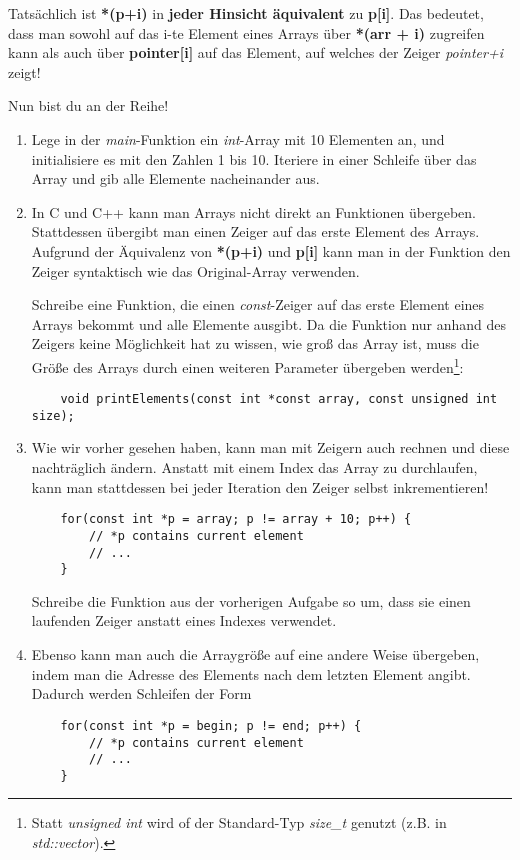 Tatsächlich ist \textbf{*(p+i)} in \textbf{jeder Hinsicht äquivalent} zu \textbf{p[i]}.
Das bedeutet, dass man sowohl auf das i-te Element eines Arrays über \textbf{*(arr + i)} zugreifen kann als auch über \textbf{pointer[i]} auf das Element, auf welches der Zeiger \emph{pointer+i} zeigt!

Nun bist du an der Reihe!

\begin{enumerate}
\item 
Lege in der \emph{main}-Funktion ein \emph{int}-Array mit 10 Elementen an, und initialisiere es mit den Zahlen 1 bis 10.
Iteriere in einer Schleife über das Array und gib alle Elemente nacheinander aus.

\item
In C und C++ kann man Arrays nicht direkt an Funktionen übergeben.
Stattdessen übergibt man einen Zeiger auf das erste Element des Arrays. Aufgrund der Äquivalenz von \textbf{*(p+i) } und \textbf{p[i]} kann man in der Funktion den Zeiger syntaktisch wie das Original-Array verwenden.

Schreibe eine Funktion, die einen \emph{const}-Zeiger auf das erste Element eines Arrays bekommt und alle Elemente ausgibt.
Da die Funktion nur anhand des Zeigers keine Möglichkeit hat zu wissen, wie groß das Array ist, muss die Größe des Arrays durch einen weiteren Parameter übergeben werden\footnote{Statt \emph{unsigned int} wird of der Standard-Typ \emph{size\_t} genutzt (z.B. in \emph{std::vector}).}:
\begin{lstlisting}
	void printElements(const int *const array, const unsigned int size);
\end{lstlisting}

\item
Wie wir vorher gesehen haben, kann man mit Zeigern auch rechnen und diese nachträglich ändern.
Anstatt mit einem Index das Array zu durchlaufen, kann man stattdessen bei jeder Iteration den Zeiger selbst inkrementieren! 

\begin{lstlisting}
	for(const int *p = array; p != array + 10; p++) {
		// *p contains current element
		// ...
	}
\end{lstlisting}

Schreibe die Funktion aus der vorherigen Aufgabe so um, dass sie einen laufenden Zeiger anstatt eines Indexes verwendet.

\item
Ebenso kann man auch die Arraygröße auf eine andere Weise übergeben, indem man  die Adresse des Elements nach dem letzten Element angibt.
Dadurch werden Schleifen der Form
\begin{lstlisting}
	for(const int *p = begin; p != end; p++) {
		// *p contains current element
		// ...
	}
\end{lstlisting}


\end{enumerate}
